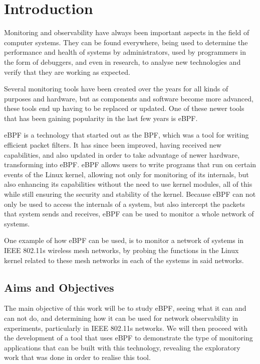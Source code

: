 \chapter{Introduction}\label{chap:intro}

Monitoring and observability have always been important aspects in the field of
computer systems. They can be found everywhere, being used to determine the
performance and health of systems by administrators, used by programmers in the
form of debuggers, and even in research, to analyse new technologies and verify
that they are working as expected.

Several monitoring tools have been created over the years for all kinds of
purposes and hardware, but as components and software become more advanced,
these tools end up having to be replaced or updated. One of these newer tools
that has been gaining popularity in the last few years is eBPF.

eBPF is a technology that started out as the \ac{BPF}, which was a tool for
writing efficient packet filters. It has since been improved, having received
new capabilities, and also updated in order to take advantage of newer hardware,
transforming into eBPF. eBPF allows users to write programs that run on certain
events of the Linux kernel, allowing not only for monitoring of its internals,
but also enhancing its capabilities without the need to use kernel modules, all
of this while still ensuring the security and stability of the kernel. Because
eBPF can not only be used to access the internals of a system, but also
intercept the packets that system sends and receives, eBPF can be used to
monitor a whole network of systems.

One example of how eBPF can be used, is to monitor a network of systems in
\ac{IEEE} 802.11s wireless mesh networks, by probing the functions in the Linux
kernel related to these mesh networks in each of the systems in said networks.


\section{Aims and Objectives}

The main objective of this work will be to study eBPF, seeing what it can and
can not do, and determining how it can be used for network observability in
experiments, particularly in \ac{IEEE} 802.11s networks. We will then proceed
with the development of a tool that uses eBPF to demonstrate the type of
monitoring applications that can be built with this technology, revealing the
exploratory work that was done in order to realise this tool.


